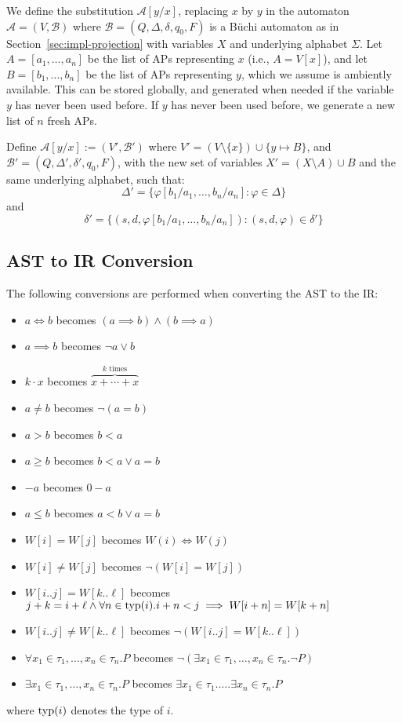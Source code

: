 We define the substitution $\mathcal{A}[y/x]$, replacing $x$ by $y$ in the automaton $\mathcal{A} = (V, \mathcal{B})$ where $\mathcal{B} = (Q, \Delta, \delta, q_0, F)$ is a B\"uchi automaton as in Section~\ref{sec:impl-projection} with variables $X$ and underlying alphabet $\Sigma$.
Let $A = [a_1, \ldots, a_n]$ be the list of APs representing $x$ (i.e., $A = V[x]$), and let $B = [b_1, \ldots, b_n]$ be the list of APs representing $y$, which we assume is ambiently available.
This can be stored globally, and generated when needed if the variable $y$ has never been used before.
If $y$ has never been used before, we generate a new list of $n$ fresh APs.

Define $\mathcal{A}[y/x] := (V', \mathcal{B}')$ where $V' = (V \setminus \{ x \}) \cup \{ y \mapsto B \}$, and $\mathcal{B}' = (Q, \Delta', \delta', q_0, F)$, with the new set of variables $X' = (X \setminus A) \cup B$ and the same underlying alphabet, such that:
\[
    \Delta' = \{ \varphi[b_1/a_1, \ldots, b_n/a_n] : \varphi \in \Delta \}
\]
and
\[
    \delta' = \{ (s, d, \varphi[b_1/a_1, \ldots, b_n/a_n]) : (s, d, \varphi) \in \delta' \}
\]

\subsection{AST to IR Conversion}\label{sec:ast-to-ir}

The following conversions are performed when converting the AST to the IR:

\begin{itemize}
    \item $a \iff b$ becomes $(a \implies b) \land (b \implies a)$
    \item $a \implies b$ becomes $\lnot a \lor b$
    \item $k \cdot x$ becomes $\overbrace{x + \cdots + x}^{k \text{ times}}$
    \item $a \neq b$ becomes $\lnot (a = b)$
    \item $a > b$ becomes $b < a$
    \item $a \geq b$ becomes $b < a \lor a = b$
    \item $-a$ becomes $0 - a$
    \item $a \leq b$ becomes $a < b \lor a = b$
    \item $W[i] = W[j]$ becomes $W(i) \iff W(j)$
    \item $W[i] \neq W[j]$ becomes $\lnot (W[i] = W[j])$
    \item $W[i..j] = W[k..\ell]$ becomes $j + k = i + \ell \land \forall n \in \text{typ}{\left( {i} \right)}. i + n < j \implies W[i + n] = W[k + n]$
    \item $W[i..j] \neq W[k..\ell]$ becomes $\lnot (W[i..j] = W[k..\ell])$
    \item $\forall x_1 \in \tau_1, \ldots, x_n \in \tau_n. P$ becomes $\lnot (\exists x_1 \in \tau_1, \ldots, x_n \in \tau_n. \lnot P)$
    \item $\exists x_1 \in \tau_1, \ldots, x_n \in \tau_n. P$ becomes $\exists x_1 \in \tau_1. \ldots. \exists x_n \in \tau_n. P$
\end{itemize}

where $\text{typ}{\left( {i} \right)}$ denotes the type of $i$.
